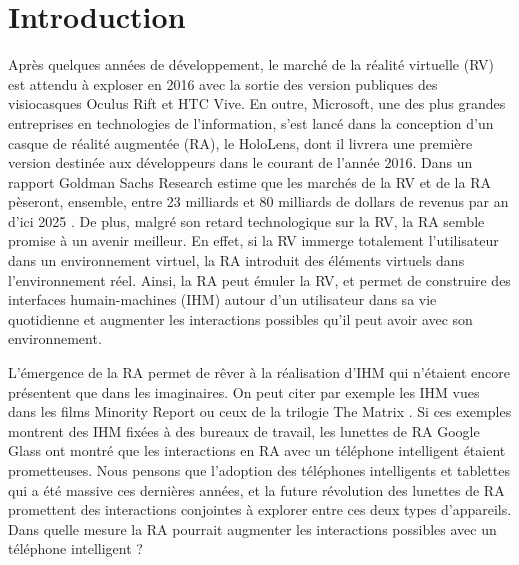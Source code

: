 \section*{Introduction}
Après quelques années de développement, le marché de la réalité virtuelle (RV) est attendu à exploser en 2016 avec la sortie des version publiques des visiocasques Oculus Rift et HTC Vive. En outre, Microsoft, une des plus grandes entreprises en technologies de l'information, s'est lancé dans la conception d'un casque de réalité augmentée (RA), le HoloLens, dont il livrera une première version destinée aux développeurs dans le courant de l'année 2016. Dans un rapport Goldman Sachs Research estime que les marchés de la RV et de la RA pèseront, ensemble, entre 23 milliards et 80 milliards de dollars de revenus par an d'ici 2025 \citep{BelliniChenSugiyamaEtAl2016}. De plus, malgré son retard technologique sur la RV, la RA semble promise à un avenir meilleur. \citep{BelliniChenSugiyamaEtAl2016} En effet, si la RV immerge totalement l'utilisateur dans un environnement virtuel, la RA introduit des éléments virtuels dans l'environnement réel. Ainsi, la RA peut émuler la RV, et permet de construire des interfaces humain-machines (IHM) autour d'un utilisateur dans sa vie quotidienne et augmenter les interactions possibles qu'il peut avoir avec son environnement.

L'émergence de la RA permet de rêver à la réalisation d'IHM qui n'étaient encore présentent que dans les imaginaires. On peut citer par exemple les IHM vues dans les films Minority Report  ou ceux de la trilogie The Matrix . Si ces exemples montrent des IHM fixées à des bureaux de travail, les lunettes de RA Google Glass ont montré que les interactions en RA avec un téléphone intelligent étaient prometteuses. Nous pensons que l'adoption des téléphones intelligents et tablettes qui a été massive ces dernières années, et la future révolution des lunettes de RA promettent des interactions conjointes à explorer entre ces deux types d'appareils. Dans quelle mesure la RA pourrait augmenter les interactions possibles avec un téléphone intelligent ?



